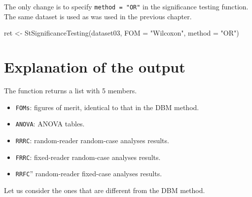 \documentclass[
]{book}
\newenvironment{Shaded}{\begin{snugshade}}{\end{snugshade}}
\newcommand{\AttributeTok}[1]{\textcolor[rgb]{0.77,0.63,0.00}{#1}}
\newcommand{\FunctionTok}[1]{\textcolor[rgb]{0.00,0.00,0.00}{#1}}
\newcommand{\NormalTok}[1]{#1}
\newcommand{\OtherTok}[1]{\textcolor[rgb]{0.56,0.35,0.01}{#1}}
\newcommand{\StringTok}[1]{\textcolor[rgb]{0.31,0.60,0.02}{#1}}
\providecommand{\tightlist}{%
  \setlength{\itemsep}{0pt}\setlength{\parskip}{0pt}}
\begin{document}
The only change is to specify \texttt{method\ =\ "OR"} in the significance testing function. The same dataset is used as was used in the previous chapter.

\begin{Shaded}
\begin{Highlighting}[]
\NormalTok{ret }\OtherTok{\textless{}{-}} \FunctionTok{StSignificanceTesting}\NormalTok{(dataset03, }\AttributeTok{FOM =} \StringTok{"Wilcoxon"}\NormalTok{, }\AttributeTok{method =} \StringTok{"OR"}\NormalTok{)}
\end{Highlighting}
\end{Shaded}

\hypertarget{quick-start-or-text-explanation}{%
\section{Explanation of the output}\label{quick-start-or-text-explanation}}

The function returns a list with 5 members.

\begin{itemize}
\tightlist
\item
  \texttt{FOMs}: figures of merit, identical to that in the DBM method.
\item
  \texttt{ANOVA}: ANOVA tables.
\item
  \texttt{RRRC}: random-reader random-case analyses results.
\item
  \texttt{FRRC}: fixed-reader random-case analyses results.
\item
  \texttt{RRFC}'' random-reader fixed-case analyses results.
\end{itemize}

Let us consider the ones that are different from the DBM method.
\end{document}
